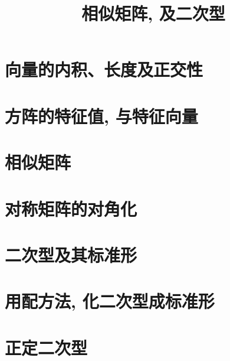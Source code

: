 \documentclass[UTF8]{ctexart}
\title{相似矩阵, 及二次型}
\begin{document}
	\tableofcontents %
	\date{} %
	\maketitle  %
	
	
	\part{向量的内积、长度及正交性}
	
	\part{方阵的特征值, 与特征向量}
	
	\part{相似矩阵}
	
	\part{对称矩阵的对角化}
	
	\part{二次型及其标准形}
	
	\part{用配方法, 化二次型成标准形}
	
	\part{正定二次型}
	

	
\end{document}
